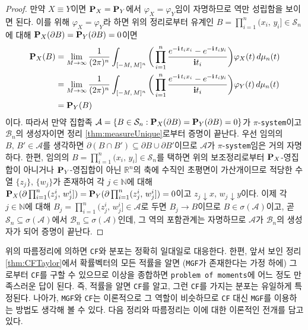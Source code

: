 \begin{proof}
    만약 $X\equiv Y$이면 $\mathbf{P}_X=\mathbf{P}_Y$에서 $\varphi_X=\varphi_Y$임이 자명하므로 역만 성립함을 보이면 된다. 이를 위해 $\varphi_X=\varphi_Y$라 하면 위의 정리로부터 유계인 $B=\prod_{i=1}^n(x_i,\,y_i]\in\mathcal{S}_n$에 대해 $\mathbf{P}_X(\partial B)=\mathbf{P}_Y(\partial B)=0$이면
    \begin{align*}
        \mathbf{P}_X(B)&=\lim_{M\to\infty}\frac{1}{(2\pi)^n}\int_{[-M,\,M]^n}\bigg(\prod_{i=1}^n\frac{e^{-\mathbf{i}\,t_ix_i}-e^{-\mathbf{i}\,t_iy_i}}{\mathbf{i} t_i}\bigg)\varphi_X(t)\,d\mu_n(t)\\
        &=\lim_{M\to\infty}\frac{1}{(2\pi)^n}\int_{[-M,\,M]^n}\bigg(\prod_{i=1}^n\frac{e^{-\mathbf{i}\,t_ix_i}-e^{-\mathbf{i}\,t_iy_i}}{\mathbf{i} t_i}\bigg)\varphi_Y(t)\,d\mu_n(t)\\
        &=\mathbf{P}_Y(B)
    \end{align*}
    이다. 따라서 만약 집합족 $\mathcal{A}=\{B\in\mathcal{S}_n:\mathbf{P}_X(\partial B)=\mathbf{P}_Y(\partial B)=0\}$가 $\pi$-\texttt{system}이고 $\mathcal{B}_n$의 생성자이면 정리 \ref{thm:measureUnique}로부터 증명이 끝난다. 우선 임의의 $B,\,B'\in\mathcal{A}$를 생각하면 $\partial(B\cap B')\subseteq\partial B\cup\partial B'$이므로 $\mathcal{A}$가 $\pi$-\texttt{system}임은 거의 자명하다. 한편, 임의의 $B=\prod_{i=1}^n(x_i,\,y_i]\in\mathcal{S}_n$를 택하면 위의 보조정리로부터 $\mathbf{P}_X$-영집합이 아니거나 $\mathbf{P}_Y$-영집합이 아닌 $\mathbb{R}^n$의 축에 수직인 초평면이 가산개이므로 적당한 수열 $\{z_j\},\,\{w_j\}$가 존재하여 각 $j\in\mathbb{N}$에 대해 $\mathbf{P}_X(\partial\prod_{i=1}^n(z_j^i,\,w_j^i])=\mathbf{P}_Y(\partial\prod_{i=1}^n(z_j^i,\,w_j^i])=0$이고 $z_j\downarrow x,\,w_j\downarrow y$이다. 이제 각 $j\in\mathbb{N}$에 대해 $B_j=\prod_{i=1}^n(z_j^i,\,w_j^i]\in\mathcal{A}$로 두면 $B_j\to B$이므로 $B\in\sigma(\mathcal{A})$이고, 곧 $\mathcal{S}_n\subseteq\sigma(\mathcal{A})$에서 $\mathcal{B}_n\subseteq\sigma(\mathcal{A})$인데, 그 역의 포함관계는 자명하므로 $\mathcal{A}$가 $\mathcal{B}_n$의 생성자가 되어 증명이 끝난다.
\end{proof}

위의 따름정리에 의하면 \texttt{CF}와 분포는 정확히 일대일로 대응한다. 한편, 앞서 보인 정리 \ref{thm:CFTaylor}에서 확률벡터의 모든 적률을 알면 (\texttt{MGF}가 존재한다는 가정 하에) 그로부터 \texttt{CF}를 구할 수 있으므로 이상을 종합하면 \texttt{problem of moments}에 어느 정도 만족스러운 답이 된다. 즉, 적률을 알면 \texttt{CF}를 알고, 그런 \texttt{CF}를 가지는 분포는 유일하게 특정된다. 나아가, \texttt{MGF}와 \texttt{CF}는 이론적으로 그 역할이 비슷하므로 \texttt{CF} 대신 \texttt{MGF}를 이용하는 방법도 생각해 볼 수 있다. 다음 정리와 따름정리는 이에 대한 이론적인 전개를 담고 있다.

